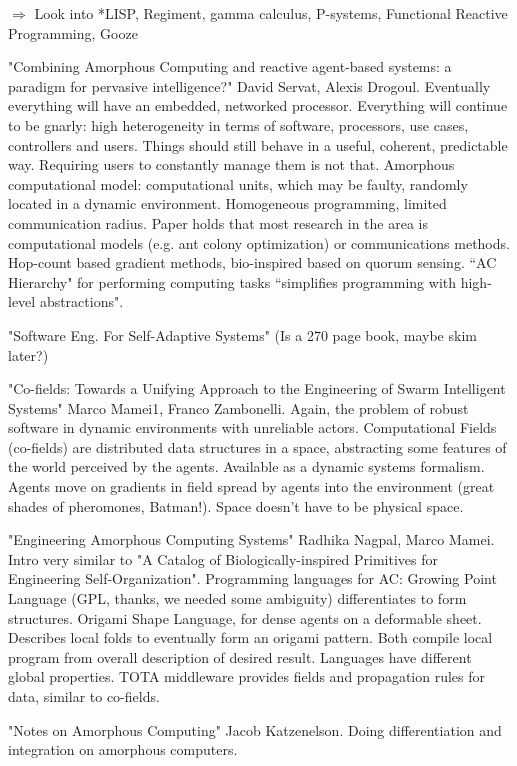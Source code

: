 \documentclass[]{article}
\begin{document}
$\Rightarrow$ Look into *LISP, Regiment, gamma calculus, P-systems, Functional Reactive Programming, Gooze

"Combining Amorphous Computing and reactive agent-based systems: a paradigm for pervasive intelligence?" David Servat, Alexis Drogoul. Eventually everything will have an embedded, networked processor. Everything will continue to be gnarly: high heterogeneity in terms of software, processors, use cases, controllers and users. Things should still behave in a useful, coherent, predictable way. Requiring users to constantly manage them is not that. Amorphous computational model: computational units, which may be faulty, randomly located in a dynamic environment. Homogeneous programming, limited communication radius. Paper holds that most research in the area is computational models (e.g. ant colony optimization) or communications methods. Hop-count based gradient methods, bio-inspired based on quorum sensing. ``AC Hierarchy" for performing computing tasks ``simplifies programming with high-level abstractions". 

"Software Eng. For Self-Adaptive Systems" (Is a 270 page book, maybe skim later?)

"Co-fields: Towards a Unifying Approach to the Engineering of Swarm Intelligent Systems" \cite{mamei2003co} Marco Mamei1, Franco Zambonelli. Again, the problem of robust software in dynamic environments with unreliable actors. Computational Fields (co-fields) are distributed data structures in a space, abstracting some features of the world perceived by the agents. Available as a dynamic systems formalism. Agents move on gradients in field spread by agents into the environment (great shades of pheromones, Batman!). Space doesn't have to be physical space. 

"Engineering Amorphous Computing Systems" \cite{nagpal2004engineering} Radhika Nagpal, Marco Mamei. Intro very similar to "A Catalog of Biologically-inspired Primitives for Engineering Self-Organization". Programming languages for AC: Growing Point Language (GPL, thanks, we needed some ambiguity) differentiates to form structures. Origami Shape Language, for dense agents on a deformable sheet. Describes local folds to eventually form an origami pattern. Both compile local program from overall description of desired result. Languages have different global properties. TOTA middleware provides fields and propagation rules for data, similar to co-fields. 

"Notes on Amorphous Computing" Jacob Katzenelson. \cite{katzenelson2000notes} Doing differentiation and integration on amorphous computers. 
\end{document}

